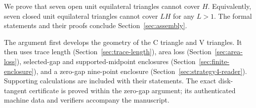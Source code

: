 We prove that seven open unit equilateral triangles cannot cover $H$.
Equivalently, seven closed unit equilateral triangles cannot cover $LH$
for any $L>1$. The formal statements and their proofs conclude
Section~\ref{sec:assembly}.

The argument first develops the geometry of the C triangle and V triangles.
It then uses trace length (Section~\ref{sec:trace-length}), area loss
(Section~\ref{sec:area-loss}), selected-gap and supported-midpoint enclosures
(Section~\ref{sec:finite-enclosure}), and a zero-gap nine-point enclosure
(Section~\ref{sec:strategy4-reader}). Supporting calculations are included
with their statements. The exact disk-tangent certificate is proved within
the zero-gap argument; its authenticated machine data and verifiers accompany
the manuscript.
